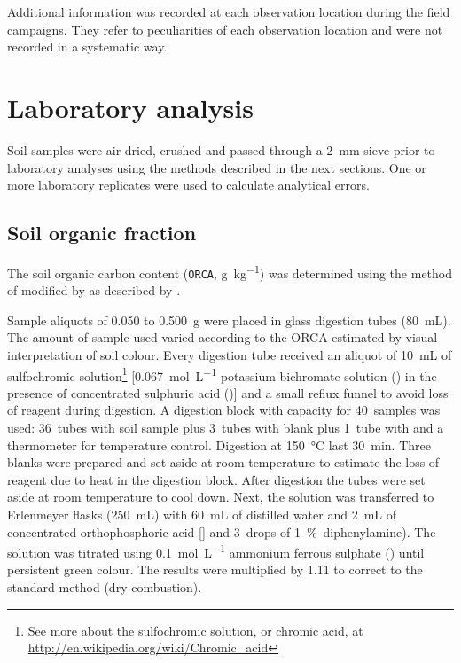 Additional information was recorded at each observation location during the field campaigns. They refer to 
peculiarities of each observation location and were not recorded in a systematic way.

\tocless\section{Laboratory analysis}

Soil samples were air dried, crushed and passed through a \SI{2}{\milli\metre}-sieve prior to laboratory 
analyses using the methods described in the next sections. One or more laboratory replicates were used to 
calculate analytical errors.

\tocless\subsection{Soil organic fraction}
\label{apen:soil-data-orca}

The soil organic carbon content (\texttt{ORCA}, \si{\gram\per\kilo\gram}) was determined using the method of
 modified by  as described by
.

Sample aliquots of \num{0.050} to \SI{0.500}{\gram} were placed in glass digestion tubes 
(\SI{80}{\milli\liter}). The amount of sample used varied according to the ORCA estimated by visual 
interpretation of soil colour. Every digestion tube received an aliquot of \SI{10}{\milli\liter} of 
sulfochromic solution\footnote{See more about the sulfochromic solution, or chromic acid, at
\url{http://en.wikipedia.org/wiki/Chromic_acid}} [\SI{0.067}{\mole\per\liter} potassium bichromate solution
() in the presence of concentrated sulphuric acid ()] and a small reflux funnel 
to avoid loss of reagent during digestion. A digestion block with capacity for \num{40}~samples was used:
\num{36}~tubes with soil sample plus \num{3}~tubes with blank plus \num{1}~tube with  and a
thermometer for temperature control. Digestion at \SI{150}{\celsius} last \SI{30}{\minute}. Three blanks 
were prepared and set aside at room temperature to estimate the loss of reagent due to heat in the digestion 
block. After digestion the tubes were set aside at room temperature to cool down. Next, the solution was 
transferred to Erlenmeyer flasks (\SI{250}{\milli\liter}) with \SI{60}{\milli\liter} of distilled water and
\SI{2}{\milli\liter} of concentrated orthophosphoric acid [] and \num{3}~drops of 
\SI{1}{\percent}~diphenylamine). The solution was titrated using \SI{0.1}{\mole\per\liter} ammonium ferrous
sulphate () until persistent green colour. The results were multiplied by \num{1.11}
to correct to the standard method (dry combustion).

